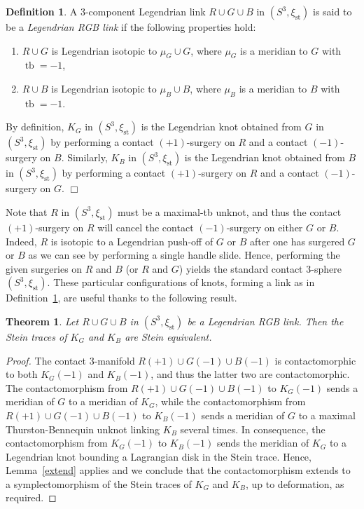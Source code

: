 \documentclass[11pt]{amsart} %
\DeclareMathOperator{\tb}{tb}
\newcommand{\xist}{\xi_{\mathrm{st}}}
\theoremstyle{plain}
\newtheorem{thm}[Theorem]{Theorem}
\theoremstyle{definition}
\newtheorem{defi}[Theorem]{Definition}
\begin{document}
\begin{defi}\label{def:RGB}
A 3-component Legendrian link $R\cup G\cup B$ in $(S^3,\xist)$ is said to be a {\it Legendrian RGB link} if the following properties hold:
\begin{enumerate} 
	\item $R\cup G$ is Legendrian isotopic to $\mu_G\cup G$, where $\mu_G$ is a meridian to $G$ with $\tb=-1$,
	\item $R\cup B$ is Legendrian isotopic to $\mu_B\cup B$, where $\mu_B$ is a meridian to $B$ with $\tb=-1$.
\end{enumerate}
By definition, $K_G$ in $(S^3,\xist)$ is the Legendrian knot obtained from $G$ in $(S^3,\xist)$ by performing a contact $(+1)$-surgery on $R$ and a contact $(-1)$-surgery on $B$. Similarly, $K_B$ in $(S^3,\xist)$ is the Legendrian knot obtained from $B$ in $(S^3,\xist)$ by performing a contact $(+1)$-surgery on $R$ and a contact $(-1)$-surgery on $G$. \hfill$\Box$
\end{defi}

Note that $R$ in $(S^3,\xist)$ must be a maximal-tb unknot, and thus the contact $(+1)$-surgery on $R$ will cancel the contact $(-1)$-surgery on either $G$ or $B$. Indeed, $R$ is isotopic to a Legendrian push-off of $G$ or $B$ after one has surgered $G$ or $B$ as we can see by performing a single handle slide. Hence, performing the given surgeries on $R$ and $B$ (or $R$ and $G$) yields the standard contact $3$-sphere $(S^3,\xist)$. These particular configurations of knots, forming a link as in Definition~\ref{def:RGB}, are useful thanks to the following result.

\begin{thm}\label{thm:easySteintraces}
Let $R\cup G\cup B$ in $(S^3,\xist)$ be a Legendrian RGB link. Then the Stein traces of $K_G$ and $K_B$ are Stein equivalent.
\end{thm}

\begin{proof}
The contact 3-manifold $R(+1)\cup G(-1)\cup B(-1)$ is contactomorphic to both $K_G(-1)$ and $K_B(-1)$, and thus the latter two are contactomorphic. The contactomorphism from $R(+1)\cup G(-1)\cup B(-1)$ to $K_G(-1)$ sends a meridian of $G$ to a meridian of $K_G$, while the contactomorphism from $R(+1)\cup G(-1)\cup B(-1)$ to $K_B(-1)$ sends a meridian of $G$ to a maximal Thurston-Bennequin unknot linking $K_B$ several times.  In consequence, the contactomorphism from $K_G(-1)$ to $K_B(-1)$ sends the meridian of $K_G$ to a Legendrian knot bounding a Lagrangian disk in the Stein trace. Hence, Lemma~\ref{extend} applies and we conclude that the contactomorphism extends to a symplectomorphism of the Stein traces of $K_G$ and $K_B$, up to deformation, as required.
\end{proof}
\end{document}
